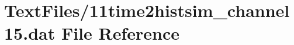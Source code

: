 \hypertarget{11time2histsim__channel15_8dat}{}\section{Text\+Files/11time2histsim\+\_\+channel15.dat File Reference}
\label{11time2histsim__channel15_8dat}

